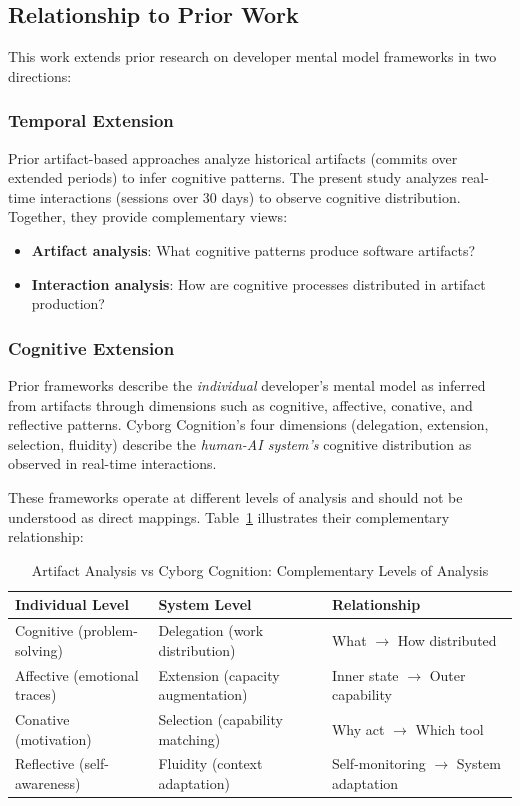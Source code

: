 \documentclass{ntlabs-preprint}
\begin{document}
\subsection{Relationship to Prior Work}

This work extends prior research on developer mental model frameworks in two directions:

\subsubsection{Temporal Extension}

Prior artifact-based approaches analyze historical artifacts (commits over extended periods) to infer cognitive patterns. The present study analyzes real-time interactions (sessions over 30 days) to observe cognitive distribution. Together, they provide complementary views:

\begin{itemize}
    \item \textbf{Artifact analysis}: What cognitive patterns produce software artifacts?
    \item \textbf{Interaction analysis}: How are cognitive processes distributed in artifact production?
\end{itemize}

\subsubsection{Cognitive Extension}

Prior frameworks describe the \textit{individual} developer's mental model as inferred from artifacts through dimensions such as cognitive, affective, conative, and reflective patterns. Cyborg Cognition's four dimensions (delegation, extension, selection, fluidity) describe the \textit{human-AI system's} cognitive distribution as observed in real-time interactions.

These frameworks operate at different levels of analysis and should not be understood as direct mappings. Table~\ref{tab:frameworks} illustrates their complementary relationship:

\begin{table}[h]
\centering
\caption{Artifact Analysis vs Cyborg Cognition: Complementary Levels of Analysis}
\label{tab:frameworks}
\begin{tabular}{lll}
\toprule
\textbf{Individual Level} & \textbf{System Level} & \textbf{Relationship} \\
\midrule
Cognitive (problem-solving) & Delegation (work distribution) & What $\rightarrow$ How distributed \\
Affective (emotional traces) & Extension (capacity augmentation) & Inner state $\rightarrow$ Outer capability \\
Conative (motivation) & Selection (capability matching) & Why act $\rightarrow$ Which tool \\
Reflective (self-awareness) & Fluidity (context adaptation) & Self-monitoring $\rightarrow$ System adaptation \\
\bottomrule
\end{tabular}
\end{table}
\end{document}
